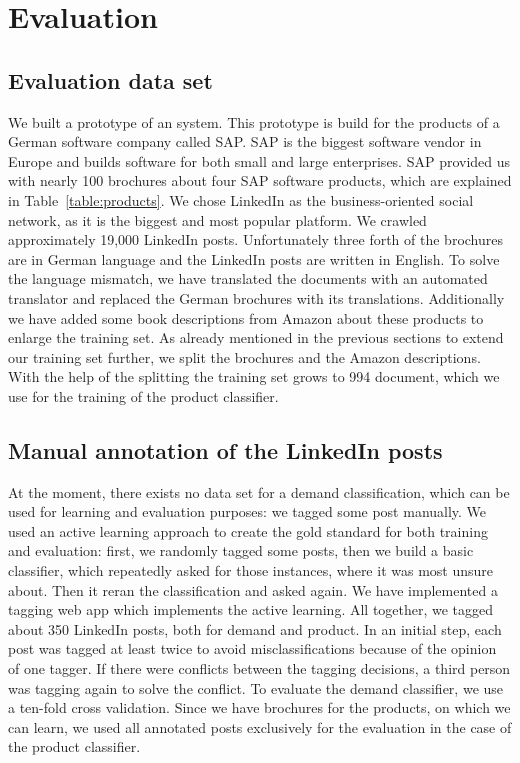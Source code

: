 
\section{Evaluation}
\label{sec:evaluation}


\subsection{Evaluation data set} %
\label{sub:initial_data_set}
We built a prototype of an \nto system.
This prototype is build for the products of a German software company called SAP.
SAP is the biggest software vendor in Europe and builds software for both small and large enterprises.
SAP provided us with nearly 100 brochures about four SAP software products, which are explained in Table~\ref{table:products}.
We chose LinkedIn as the business-oriented social network, as it is the biggest and most popular platform.
We crawled approximately 19,000 LinkedIn posts.
Unfortunately three forth of the brochures are in German language and the LinkedIn posts are written in English.
To solve the language mismatch, we have translated the documents with an automated translator and replaced the German brochures with its translations.
Additionally we have added some book descriptions from Amazon about these products to enlarge the training set.
As already mentioned in the previous sections to extend our training set further, we split the brochures and the Amazon descriptions.
With the help of the splitting the training set grows to 994 document, which we use for the training of the product classifier.


\subsection{Manual annotation of the LinkedIn posts} %
\label{sub:manual_annotation_of_the_linkedin_posts}

At the moment, there exists no data set for a demand classification, which can be used for learning and evaluation purposes: we tagged some post manually.
We used an active learning \nr approach to create the gold standard for both training and evaluation:
first, we randomly tagged some posts, then we build a basic classifier, which repeatedly asked for those instances, where it was most unsure about.
Then it reran the classification and asked again.
We have implemented a tagging web app which implements the active learning.
All together, we tagged about 350 LinkedIn posts, both for demand and product.
In an initial step, each post was tagged at least twice to avoid misclassifications because of the opinion of one tagger.
If there were conflicts between the tagging decisions, a third person was tagging again to solve the conflict.
To evaluate the demand classifier, we use a ten-fold cross validation.
Since we have brochures for the products, on which we can learn, we used all annotated posts exclusively for the evaluation in the case of the product classifier.

